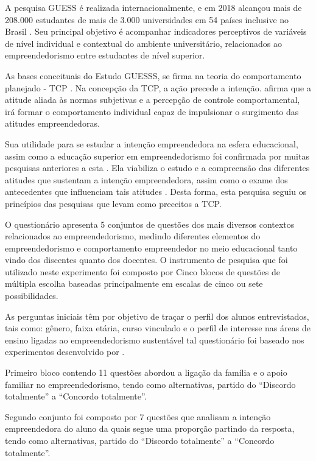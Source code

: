 A pesquisa GUESS é realizada internacionalmente, e em 2018 alcançou mais de 208.000 estudantes de mais de 3.000 universidades em 54 países inclusive no Brasil \cite{sieger_global_2018}.  Seu  principal  objetivo  é  acompanhar  indicadores perceptivos   de   variáveis   de   nível individual   e   contextual   do   ambiente   universitário, relacionados ao empreendedorismo entre estudantes de nível superior.


As bases conceituais do Estudo GUESSS, se firma na teoria do comportamento planejado - TCP \cite{ajzen_perceived_2002}. Na concepção da TCP, a ação precede a intenção.  afirma que a atitude aliada às normas subjetivas e a percepção de controle comportamental, irá formar o comportamento individual capaz de impulsionar o surgimento das atitudes empreendedoras.

Sua utilidade para se estudar a intenção empreendedora na esfera educacional, assim como a  educação superior em empreendedorismo foi confirmada por muitas pesquisas anteriores a esta \cite{krueger_potencial_2018,gonzalez_predictors_2009,fayolle_effect_2006} . Ela viabiliza o estudo e a compreensão das diferentes atitudes que sustentam a intenção empreendedora, assim como o exame dos antecedentes que influenciam tais atitudes \cite{lima_educacao_2014}. Desta forma, esta pesquisa seguiu os princípios das pesquisas que levam como preceitos a TCP.

O questionário apresenta 5 conjuntos de questões dos mais diversos contextos relacionados ao empreendedorismo, medindo diferentes elementos do empreendedorismo e comportamento empreendedor no meio educacional tanto vindo dos discentes quanto dos docentes. O instrumento de pesquisa que foi utilizado neste experimento foi composto por Cinco blocos de questões de múltipla escolha baseadas principalmente em escalas de cinco ou sete possibilidades.

As perguntas iniciais têm por objetivo de traçar o perfil dos alunos entrevistados, tais como: gênero, faixa etária, curso vinculado e o perfil de interesse nas áreas de ensino ligadas ao empreendedorismo sustentável tal questionário foi baseado nos experimentos desenvolvido por . 

Primeiro bloco contendo 11 questões abordou a ligação da família e o apoio familiar no empreendedorismo, tendo como alternativas, partido do “Discordo totalmente” a “Concordo totalmente”.

Segundo conjunto foi composto por 7 questões que analisam a intenção empreendedora do aluno da quais segue uma proporção partindo da resposta, tendo como alternativas, partido do “Discordo totalmente” a “Concordo totalmente”.

